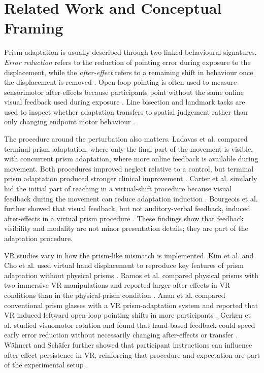 \section*{Related Work and Conceptual Framing}

Prism adaptation is usually described through two linked behavioural signatures. \emph{Error reduction} refers to the reduction of pointing error during exposure to the displacement, while the \emph{after-effect} refers to a remaining shift in behaviour once the displacement is removed \cite{serino2006mechanisms,Serino2011}. Open-loop pointing is often used to measure sensorimotor after-effects because participants point without the same online visual feedback used during exposure \cite{Rossetti1998Prism,Ramos2019,anan2025comparative}. Line bisection and landmark tasks are used to inspect whether adaptation transfers to spatial judgement rather than only changing endpoint motor behaviour \cite{frassinetti2002long,Serino2011,Bourgeois2021}.

The procedure around the perturbation also matters. Ladavas et al. compared terminal prism adaptation, where only the final part of the movement is visible, with concurrent prism adaptation, where more online feedback is available during movement. Both procedures improved neglect relative to a control, but terminal prism adaptation produced stronger clinical improvement \cite{Serino2011}. Carter et al. similarly hid the initial part of reaching in a virtual-shift procedure because visual feedback during the movement can reduce adaptation induction \cite{Carter2016}. Bourgeois et al. further showed that visual feedback, but not auditory-verbal feedback, induced after-effects in a virtual prism procedure \cite{Bourgeois2021}. These findings show that feedback visibility and modality are not minor presentation details; they are part of the adaptation procedure.

VR studies vary in how the prism-like mismatch is implemented. Kim et al. and Cho et al. used virtual hand displacement to reproduce key features of prism adaptation without physical prisms \cite{kim2017development,cho2022feasibility}. Ramos et al. compared physical prisms with two immersive VR manipulations and reported larger after-effects in VR conditions than in the physical-prism condition \cite{Ramos2019}. Anan et al. compared conventional prism glasses with a VR prism-adaptation system and reported that VR induced leftward open-loop pointing shifts in more participants \cite{anan2025comparative}. Gerken et al. studied visuomotor rotation and found that hand-based feedback could speed early error reduction without necessarily changing after-effects or transfer \cite{gerken2025sense}. W{\"a}hnert and Sch{\"a}fer further showed that participant instructions can influence after-effect persistence in VR, reinforcing that procedure and expectation are part of the experimental setup \cite{Wahnert2024}.

